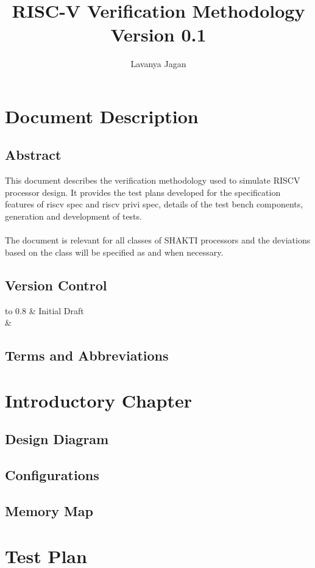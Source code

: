 \documentclass[a4paper,12pt,twoside]{article}
\title{\Huge \textbf{RISC-V Verification Methodology}\\\Large{Version 0.1}}
\author{Lavanya Jagan}
\date
\begin{document}
\maketitle
\newpage
\tableofcontents{}
\newpage
\listoffigures
\newpage
\listoftables
\newpage
\section{Document Description}
\subsection{Abstract}
This document describes the verification methodology used to simulate RISCV processor design. It provides the test plans developed for the specification features of riscv spec and riscv privi spec, details of the test bench components, generation and development of tests.\\\\
The document is relevant for all classes of SHAKTI processors and the deviations based on the class will be specified as and when necessary.
\subsection{Version Control}
\begin{tabu} to 0.8\textwidth { | X[l] | X[c] |  }
  & Initial Draft\\
 \hline
   &   \\
\hline
\end{tabu}
\subsection{Terms and Abbreviations}
\section{Introductory Chapter}
\subsection{Design Diagram}
\subsection{Configurations}
\subsection{Memory Map}
\section{Test Plan}
\end{document}
